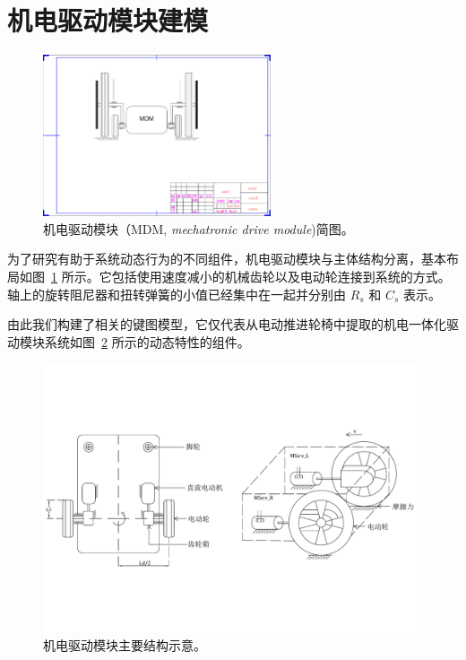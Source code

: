 \clearpage
\section{机电驱动模块建模}

\begin{figure}[!h]
	\centering
	\includegraphics[width=0.6\textwidth]{fig/MDM_modified.pdf}
	\caption{机电驱动模块（MDM, \textit{mechatronic drive module})简图。}\label{fig:MDM_modified} %
\end{figure}

为了研究有助于系统动态行为的不同组件，机电驱动模块与主体结构分离，基本布局如图~\ref{fig:MDM_modified} 所示。它包括使用速度减小的机械齿轮以及电动轮连接到系统的方式。轴上的旋转阻尼器和扭转弹簧的小值已经集中在一起并分别由 $R_s$ 和 $C_s$ 表示。

由此我们构建了相关的键图模型，它仅代表从电动推进轮椅中提取的机电一体化驱动模块系统如图~\ref{fig:MDM_scheme} 所示的动态特性的组件。

\begin{figure}[!h]
	\centering
	\includegraphics[width=1\textwidth]{fig/MDM_scheme.pdf}
	\caption{机电驱动模块主要结构示意。}\label{fig:MDM_scheme} %
\end{figure}

